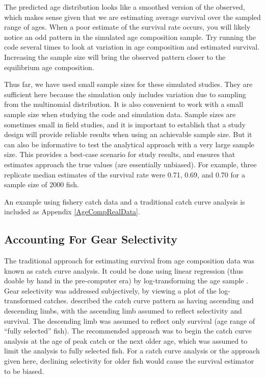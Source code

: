 \documentclass[
]{krantz}
\begin{document}
The predicted age distribution looks like a smoothed version of the observed, which makes sense given that we are estimating average survival over the sampled range of ages. When a poor estimate of the survival rate occurs, you will likely notice an odd pattern in the simulated age composition sample. Try running the code several times to look at variation in age composition and estimated survival. Increasing the sample size will bring the observed pattern closer to the equilibrium age composition.

Thus far, we have used small sample sizes for these simulated studies. They are sufficient here because the simulation only includes variation due to sampling from the multinomial distribution. It is also convenient to work with a small sample size when studying the code and simulation data. Sample sizes are sometimes small in field studies, and it is important to establish that a study design will provide reliable results when using an achievable sample size. But it can also be informative to test the analytical approach with a very large sample size. This provides a best-case scenario for study results, and ensures that estimates approach the true values (are essentially unbiased). For example, three replicate median estimates of the survival rate were 0.71, 0.69, and 0.70 for a sample size of 2000 fish.

An example using fishery catch data and a traditional catch curve analysis is included as Appendix \ref{AgeCompRealData}.

\hypertarget{CC_Selectivity}{%
\subsection{Accounting For Gear Selectivity}\label{CC_Selectivity}}

The traditional approach for estimating survival from age composition data was known as catch curve analysis. It could be done using linear regression (thus doable by hand in the pre-computer era) by log-transforming the age sample \citep{ricker1975}. Gear selectivity was addressed subjectively, by viewing a plot of the log-transformed catches. \citet{ricker1975} described the catch curve pattern as having ascending and descending limbs, with the ascending limb assumed to reflect selectivity and survival. The descending limb was assumed to reflect only survival (age range of ``fully selected'' fish). The recommended approach was to begin the catch curve analysis at the age of peak catch or the next older age, which was assumed to limit the analysis to fully selected fish. For a catch curve analysis or the approach given here, declining selectivity for older fish would cause the survival estimator to be biased.
\end{document}
